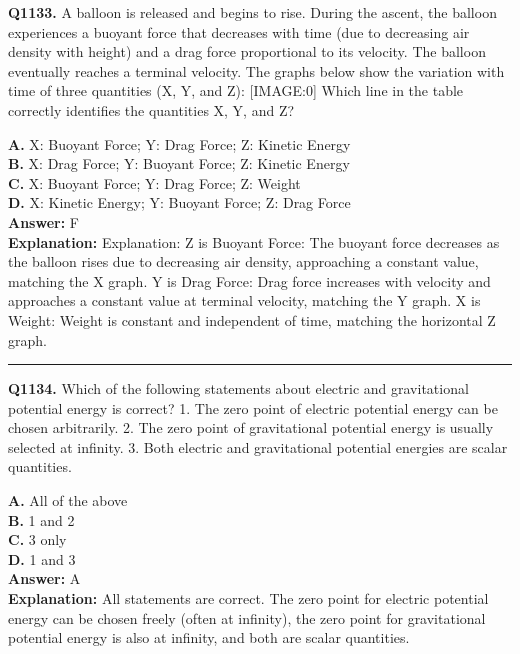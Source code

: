 \documentclass[12pt]{article}
\begin{document}
\noindent
\textbf{Q1133.} A balloon is released and begins to rise. During the ascent, the balloon experiences a buoyant force that decreases with time (due to decreasing air density with height) and a drag force proportional to its velocity. The balloon eventually reaches a terminal velocity. The graphs below show the variation with time of three quantities (X, Y, and Z):
[IMAGE:0]
Which line in the table correctly identifies the quantities X, Y, and Z?



\textbf{A.} X: Buoyant Force; Y: Drag Force; Z: Kinetic Energy \\
\textbf{B.} X: Drag Force; Y: Buoyant Force; Z: Kinetic Energy \\
\textbf{C.} X: Buoyant Force; Y: Drag Force; Z: Weight \\
\textbf{D.} X: Kinetic Energy; Y: Buoyant Force; Z: Drag Force \\

\textbf{Answer:} F \\
\textbf{Explanation:} Explanation:
Z is Buoyant Force: The buoyant force decreases as the balloon rises due to decreasing air density, approaching a constant value, matching the X graph.
Y is Drag Force: Drag force increases with velocity and approaches a constant value at terminal velocity, matching the Y graph.
X is Weight: Weight is constant and independent of time, matching the horizontal Z graph.

\hrule
\vspace{1em}


\noindent
\textbf{Q1134.} Which of the following statements about electric and gravitational potential energy is correct?
1.
The zero point of electric potential energy can be chosen arbitrarily.
2.
The zero point of gravitational potential energy is usually selected at infinity.
3.
Both electric and gravitational potential energies are scalar quantities.



\textbf{A.} All of the above \\
\textbf{B.} 1 and 2 \\
\textbf{C.} 3 only \\
\textbf{D.} 1 and 3 \\

\textbf{Answer:} A \\
\textbf{Explanation:} All statements are correct. The zero point for electric potential energy can be chosen freely (often at infinity), the zero point for gravitational potential energy is also at infinity, and both are scalar quantities.
\end{document}
